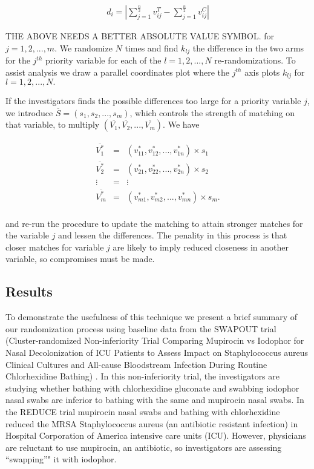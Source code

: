 \documentclass[]{sagej}
\begin{document}
\begin{eqnarray*}
 d_i = | \sum_{j = 1}^{\frac{n}{2}}v_{ij}^T - \sum_{j = 1}^{\frac{n}{2}}v_{ij}^C | 
\end{eqnarray*}

THE ABOVE NEEDS A BETTER ABSOLUTE VALUE SYMBOL. for
\(j = 1, 2, ..., m.\) We randomize \(N\) times and find \(k_{lj}\) the
difference in the two arms for the \(j^{th}\) priority variable for each
of the \(l = 1, 2, ..., N\) re-randomizations. To assist analysis we
draw a parallel coordinates plot where the \(j^{th}\) axis plots
\(k_{lj}\) for \(l = 1, 2, ..., N.\)

If the investigators finds the possible differences too large for a
priority variable \(j\), we introduce
\(\overline{S} = (s_{1}, s_{2},..., s_{m})\), which controls the
strength of matching on that variable, to multiply
\((\overline{V_1}, \overline{V_2}, ..., \overline{V_m}).\) We have

\begin{eqnarray*}
 \overline{V_1^*} & = & (v_{11}^*, v_{12}^*,..., v_{1n}^*) \times s_{1}\\
 \overline{V_2^*} & = & (v_{21}^*, v_{22}^*,..., v_{2n}^*) \times s_{2}\\
 \vdots & = & \vdots\\    
 \overline{V_m^*} & = & (v_{m1}^*, v_{m2}^*,..., v_{mn}^*) \times s_{m}.\\
 \end{eqnarray*}

and re-run the procedure to update the matching to attain stronger
matches for the variable \(j\) and lessen the differences. The penality
in this process is that closer matches for variable \(j\) are likely to
imply reduced closeness in another variable, so compromises must be
made.

\subsection{Results}\label{results}

To demonstrate the usefulness of this technique we present a brief
summary of our randomization process using baseline data from the
SWAPOUT trial (Cluster-randomized Non-inferiority Trial Comparing
Mupirocin vs Iodophor for Nasal Decolonization of ICU Patients to Assess
Impact on Staphylococcus aureus Clinical Cultures and All-cause
Bloodstream Infection During Routine Chlorhexidine Bathing)
\citep{SOTrial}. In this non-inferiority trial, the investigators are
studying whether bathing with chlorhexidine gluconate and swabbing
iodophor nasal swabs are inferior to bathing with the same and mupirocin
nasal swabs. In the REDUCE trial \citep{huang2013targeted} mupirocin
nasal swabs and bathing with chlorhexidine reduced the MRSA
Staphylococcus aureus (an antibiotic resistant infection) in Hospital
Corporation of America intensive care units (ICU). However, physicians
are reluctant to use mupirocin, an antibiotic, so investigators are
assessing ``swapping''" it with iodophor.
\end{document}
